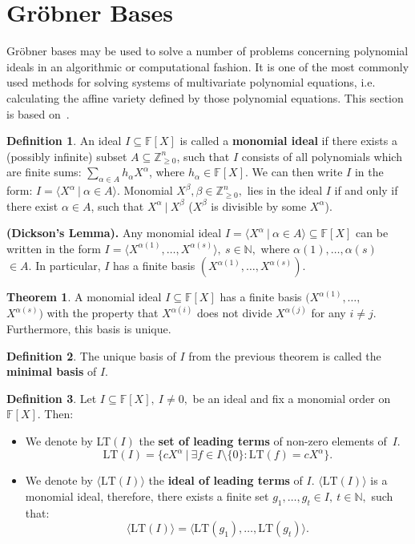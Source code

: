 \documentclass[thesis=M,english]{FITthesis}[2012/10/20]
\theoremstyle{remark}
\theoremstyle{definition}
\newtheorem{DF}{Definition}[section]
\newtheorem{theorem}{Theorem}[section]
\begin{document}
\section{Gröbner Bases}
Gröbner bases may be used to solve a number of problems concerning polynomial ideals in an algorithmic or computational fashion. It is one of the most commonly used methods for solving systems of multivariate polynomial equations, i.e. calculating the affine variety defined by those polynomial equations. This section is based on~\cite{algGeom}.
\begin{DF}
An ideal $I \subseteq \mathbb{F}[X]$ is called a \textbf{monomial ideal} if there exists a (possibly infinite) subset $A \subseteq \mathbb{Z}_{\geq 0}^n$, such that $I$ consists of all polynomials which are finite sums: $\sum_{\alpha \in A} h_\alpha X^\alpha$, where $h_\alpha \in \mathbb{F}[X].$ We can then write $I$ in the form: $I = \langle X^\alpha \ |\ \alpha \in A\rangle.$ Monomial $X^\beta, \beta \in \mathbb{Z}_{\geq 0}^n,$ lies in the ideal $I$ if and only if there exist $\alpha \in A$, such that $X^\alpha \ |\ X^\beta$ ($X^\beta$ is divisible by some $X^\alpha$). 
\end{DF}
\noindent \textbf{(Dickson's Lemma).} Any monomial ideal ${I = \langle X^\alpha \ |\ \alpha \in A\rangle \subseteq \mathbb{F}[X]}$ can be written in the form $I = \langle X^{\alpha(1)}, \ldots, X^{\alpha(s)}\rangle,\ s \in \mathbb{N},$ where $\alpha(1), \ldots, \alpha(s)$\\ $\in A$. In particular, $I$ has a finite basis $(X^{\alpha(1)}, \ldots, X^{\alpha(s)})$.
\begin{theorem}
A monomial ideal $I \subseteq \mathbb{F}[X]$ has a finite basis $(X^{\alpha(1)}, \ldots, $\\$X^{\alpha(s)})$ with the property that $X^{\alpha(i)}$ does not divide $X^{\alpha(j)}$ for any $i \neq j$. Furthermore, this basis is unique.
\end{theorem}
\begin{DF}
The unique basis of $I$ from the previous theorem is called the \textbf{minimal basis} of $I$.
\end{DF}
\begin{DF}
Let $I \subseteq \mathbb{F}[X],\ I \neq {0},$ be an ideal and fix a monomial order on $\mathbb{F}[X]$.  Then:
\begin{itemize}
\item We denote by LT$(I)$ the \textbf{set of leading terms} of non-zero elements of~$I$.
$$
\text{LT}(I) = \{ cX^\alpha \ |\ \exists f \in I \setminus \{0\}: \text{LT}(f)= cX^\alpha \}.
$$
\item We denote by $\langle \text{LT}(I) \rangle$ the \textbf{ideal of leading terms} of $I$. $\langle \text{LT}(I) \rangle$ is a monomial ideal, therefore, there exists a finite set $g_1,\ldots, g_t \in I,\ t \in \mathbb{N},$ such that:
$$
\langle \text{LT}(I) \rangle = \langle \text{LT}(g_1), \ldots, \text{LT}(g_t) \rangle.
$$
\end{itemize}
\end{DF}
\end{document}
